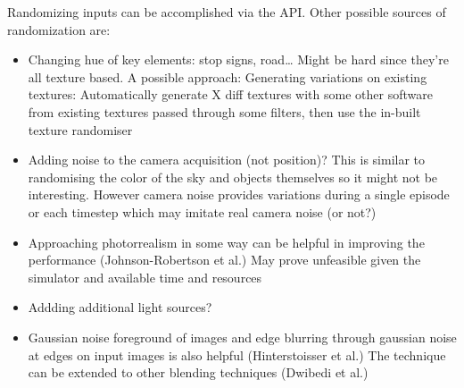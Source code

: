 Randomizing inputs can be accomplished via the API. Other possible sources of randomization are:
\begin{itemize}
    \item Changing hue of key elements: stop signs, road… Might be hard since they’re all texture based. A possible approach: Generating variations on existing textures: Automatically generate X diff textures with some other software from existing textures passed through some filters, then use the in-built texture randomiser
    \item Adding noise to the camera acquisition (not position)? This is similar to randomising the color of the sky and objects themselves so it might not be interesting. However camera noise provides variations during a single episode or each timestep which may imitate real camera noise (or not?)
    \item Approaching photorrealism in some way can be helpful in improving the performance (Johnson-Robertson et al.) May prove unfeasible given the simulator and available time and resources
    \item Addding additional light sources?
    \item Gaussian noise foreground of images and edge blurring through gaussian noise at edges on input images is also helpful (Hinterstoisser et al.) The technique can be extended to other blending techniques (Dwibedi et al.)
\end{itemize}




